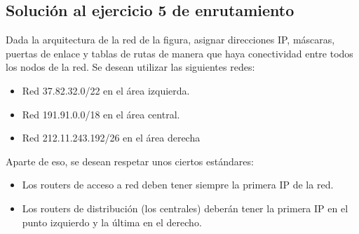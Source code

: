 \documentclass[letterpaper,10pt,spanish]{sphinxmanual}
\begin{document}
\subsection{Solución al ejercicio 5 de enrutamiento}
\label{\detokenize{t2_integracion_elementos/ejercicios_subredes_ipv4/ejercicios_dos_router:solucion-al-ejercicio-5-de-enrutamiento}}
\sphinxAtStartPar
Dada la arquitectura de la red de la figura, asignar direcciones IP, máscaras, puertas de enlace y tablas de rutas de manera que haya conectividad entre todos
los nodos de la red. Se desean utilizar las siguientes redes:
\begin{itemize}
\item {} 
\sphinxAtStartPar
Red 37.82.32.0/22 en el área izquierda.

\item {} 
\sphinxAtStartPar
Red 191.91.0.0/18 en el área central.

\item {} 
\sphinxAtStartPar
Red 212.11.243.192/26 en el área derecha

\end{itemize}

\begin{figure}[htbp]
\centering

\noindent{}
\end{figure}

\sphinxAtStartPar
Aparte de eso, se desean respetar unos ciertos estándares:
\begin{itemize}
\item {} 
\sphinxAtStartPar
Los routers de acceso a red deben tener siempre la primera IP de la red.

\item {} 
\sphinxAtStartPar
Los routers de distribución (los centrales) deberán tener la primera IP en el punto izquierdo y la última en el derecho.

\end{itemize}
\end{document}
